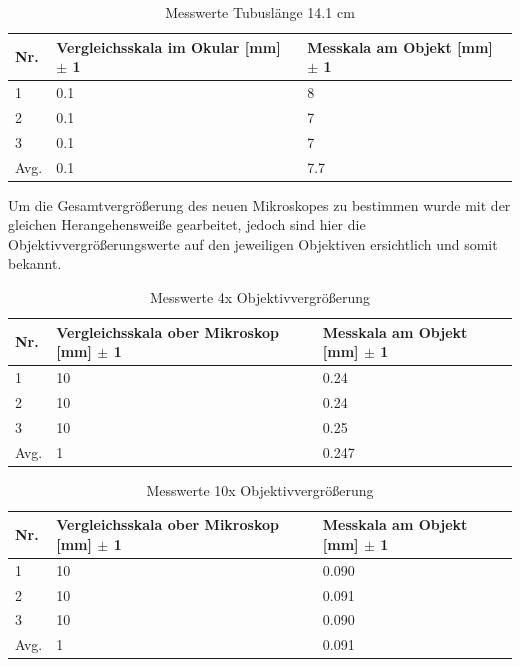 \documentclass[12pt,a4paper,twoside]{article}
\begin{document}
\begin{table}[H]
    \centering
    \caption{Messwerte Tubuslänge 14.1 cm}
    \label{tab:10XmesswerteTB14}
    \begin{tabular}{| l | l | l |}
        \hline
        Nr.   & Vergleichsskala im Okular [mm] $\pm$ 1 & Messkala am Objekt [mm] $\pm$ 1 \\
        \hline
        1 & 0.1 & 8 \\
        2 & 0.1 & 7 \\
        3 & 0.1 & 7 \\
        \hline
        Avg. & 0.1 & 7.7 \\
        \hline
    \end{tabular}
\end{table}

\noindent
Um die Gesamtvergrößerung des neuen Mikroskopes zu bestimmen wurde mit der gleichen Herangehensweiße gearbeitet, jedoch sind hier die Objektivvergrößerungswerte auf den jeweiligen Objektiven ersichtlich und somit bekannt. 

\begin{table}[H]
    \centering
    \caption{Messwerte 4x Objektivvergrößerung}
    \label{tab:messwerteNM4x}
    \begin{tabular}{| l | l | l |}
        \hline
        Nr.   & Vergleichsskala ober Mikroskop [mm] $\pm$ 1 & Messkala am Objekt [mm] $\pm$ 1 \\
        \hline
        1 & 10 & 0.24 \\
        2 & 10 & 0.24 \\
        3 & 10 & 0.25 \\
        \hline
        Avg. & 1 & 0.247 \\
        \hline
    \end{tabular}
\end{table}

\begin{table}[H]
    \centering
    \caption{Messwerte 10x Objektivvergrößerung}
    \label{tab:messwerteNM10x}
    \begin{tabular}{| l | l | l |}
        \hline
        Nr.   & Vergleichsskala ober Mikroskop [mm] $\pm$ 1 & Messkala am Objekt [mm] $\pm$ 1 \\
        \hline
        1 & 10 & 0.090 \\
        2 & 10 & 0.091 \\
        3 & 10 & 0.090 \\
        \hline
        Avg. & 1 & 0.091 \\
        \hline
    \end{tabular}
\end{table}
\end{document}
